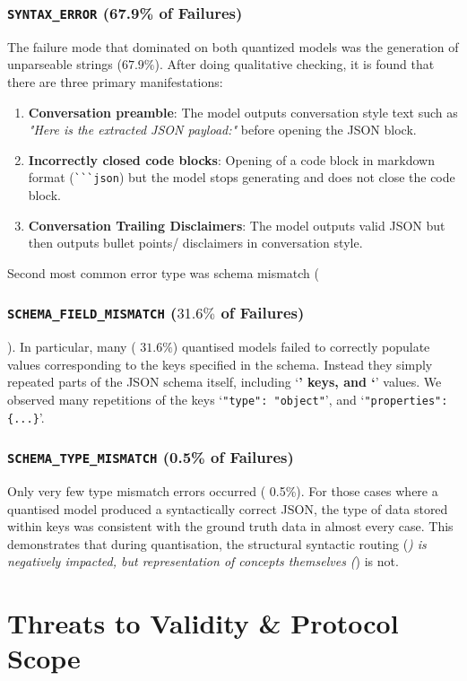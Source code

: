 \documentclass[10pt,journal,compsoc]{IEEEtran}
\newcommand{\errSyn}{\texttt{SYNTAX\_\allowbreak ERROR}}
\newcommand{\errField}{\texttt{SCHEMA\_\allowbreak FIELD\_\allowbreak MISMATCH}}
\newcommand{\errType}{\texttt{SCHEMA\_\allowbreak TYPE\_\allowbreak MISMATCH}}
\begin{document}
\subsubsection{\errSyn{} (67.9\% of Failures)}
The failure mode that dominated on both quantized models was the generation of unparseable strings ($67.9\%$). After doing qualitative checking, it is found that there are three primary manifestations:
\begin{enumerate}
    \item \textbf{Conversation preamble}: The model outputs conversation style text such as \emph{ "Here is the extracted JSON payload:" } before opening the JSON block.
    \item \textbf{Incorrectly closed code blocks}: Opening of a code block in markdown format (\verb|```json|) but the model stops generating and does not close the code block.
    \item \textbf{Conversation Trailing Disclaimers}: The model outputs valid JSON but then outputs bullet points/ disclaimers in conversation style.
\end{enumerate}

Second most common error type was schema mismatch (\subsubsection{\errField{} ($31.6\%$ of Failures)}). In particular, many ( $31.6\%$) quantised models failed to correctly populate values corresponding to the keys specified in the schema. Instead they simply repeated parts of the JSON schema itself, including ‘\textbf{’ keys, and ‘}’ values. We observed many repetitions of the keys ‘\texttt{"type": "object"}’, and ‘\texttt{"properties": \{...\}}’.

\subsubsection{\errType{} (0.5\% of Failures)}

Only very few type mismatch errors occurred ( 0.5\%). For those cases where a quantised model produced a syntactically correct JSON, the type of data stored within keys was consistent with the ground truth data in almost every case. This demonstrates that during quantisation, the structural syntactic routing (\emph{) is negatively impacted, but representation of concepts themselves (}) is not.

\section{Threats to Validity \& Protocol Scope}
\end{document}
